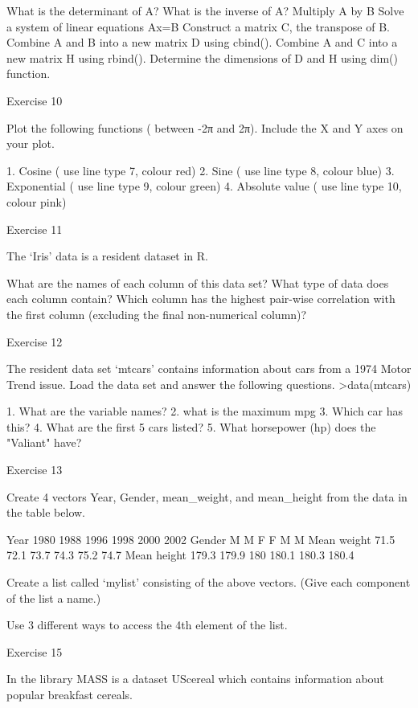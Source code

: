 What is the determinant of A?
What is the inverse of A?
Multiply A by B
Solve a system of linear equations Ax=B
Construct a matrix C, the transpose of B.
Combine A and B into a new matrix D using cbind().
Combine A and C into a new matrix H using rbind().
Determine the dimensions of D and H using dim() function.
 
Exercise 10
 
Plot the following functions ( between -2π and 2π). Include the X and Y axes on your plot.
 
1.    Cosine           	          	          	          	          	             ( use line type 7, colour  red)
2.    Sine           	          	          	          	          	             ( use line type 8, colour blue)
3.    Exponential           	          	          	          	             ( use line type 9, colour green)
4.      Absolute value           	          	          	             ( use line type 10, colour pink)
 
Exercise 11
 
The ‘Iris’ data is a resident dataset in R.
 
What are the names of each column of this data set?
What type of data does each column contain?
Which column has the highest pair-wise correlation with the first column (excluding the final non-numerical column)?
 
Exercise 12
 
The resident data set ‘mtcars’ contains information about cars from a 1974 Motor Trend issue. Load the data set and answer the following questions.
>data(mtcars)
 
1. What are the variable names?
2. what is the maximum mpg
3. Which car has this?
4. What are the first 5 cars listed?
5. What horsepower (hp) does the "Valiant" have?
 
Exercise 13
 
Create 4 vectors Year, Gender, mean_weight, and mean_height  from the data in the table below.
 
Year
1980
1988
1996
1998
2000
2002
Gender
M
M
F
F
M
M
Mean weight
71.5
72.1
73.7
74.3
75.2
74.7
Mean height
179.3
179.9
180
180.1
180.3
180.4
 
Create a list called ‘mylist’ consisting of the above vectors. (Give each component of the list a name.)
 
Use 3 different ways to access the 4th element of the list.
 
 
Exercise 15
 
In the library MASS is a dataset UScereal which contains information about popular breakfast cereals.
 
